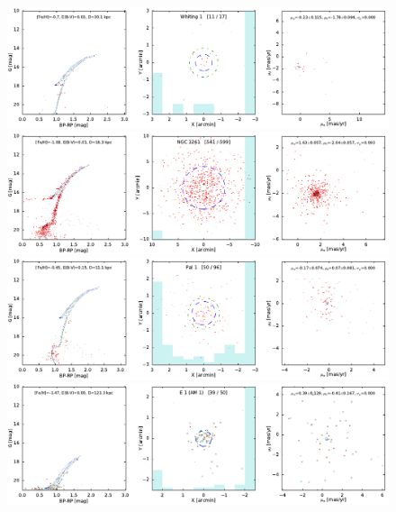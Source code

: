 \documentclass[usenatbib]{mnras}
\begin{document}
\clearpage\begin{figure}
\contcaption{}
\includegraphics{figs/Whiting_1.pdf}
\includegraphics{figs/NGC_1261.pdf}
\includegraphics{figs/Pal_1.pdf}
\includegraphics{figs/AM_1.pdf}
\end{figure}
\end{document}
